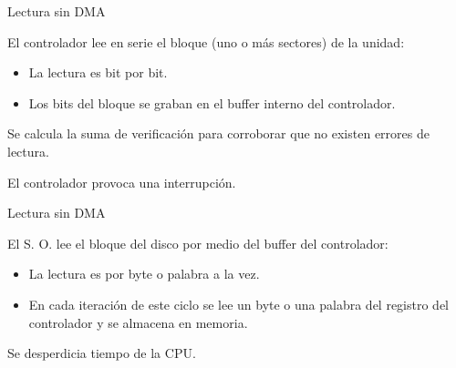 \documentclass{beamer}
\begin{document}
\begin{frame}{Lectura sin DMA}
        \begin{block}{
            El controlador lee en serie el bloque (uno o más sectores) de la unidad:
            \pause 
        }
        \begin{itemize}
            \item {
                La lectura es bit por bit.
                \pause
            }
            \item {
                Los bits del bloque se graban en el buffer interno del controlador.
                \pause
            }
        \end{itemize}
        
        \end{block}
        
        \begin{block}{
            Se calcula la suma de verificación para corroborar que no existen errores de lectura.
            
        }
        \end{block}
        \pause
        \begin{block}{
            El controlador provoca una interrupción.
        }
        \end{block}
        
\end{frame}

\begin{frame}{Lectura sin DMA}
        \begin{block}{
            El S. O. lee el bloque del disco por medio del buffer del controlador:
            \pause 
        }
        \begin{itemize}
            \item {
                La lectura es por byte o palabra a la vez.
                \pause
            }
            \item {
                En cada iteración de este ciclo se lee un byte o una palabra del registro del controlador y se almacena en memoria.
                \pause
            }
        \end{itemize}
        \end{block}
        
        \begin{block}{
            Se desperdicia tiempo de la CPU.
        }
        \end{block}
        
\end{frame}
\end{document}

